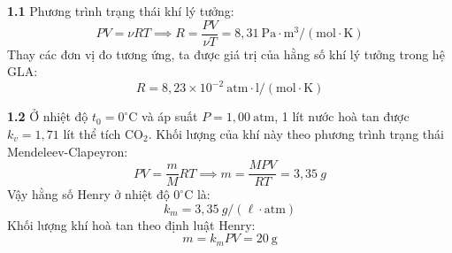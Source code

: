 \noindent\textbf{1.1} Phương trình trạng thái khí lý tưởng:
\begin{equation*}
  PV = \nu RT \implies R = \frac{PV}{\nu T} = 8{,}31~\text{Pa} \cdot \text{m}^3 / (\text{mol} \cdot \text{K})
\end{equation*}
Thay các đơn vị đo tương ứng, ta được giá trị của hằng số khí lý tưởng trong hệ GLA:
\begin{equation*}
  R = 8{,}23 \times 10^{-2}~\text{atm} \cdot \text{l}/(\text{mol} \cdot \text{K})
\end{equation*}

\noindent\textbf{1.2} Ở nhiệt độ $t_0 = 0^\circ$C và áp suất $P = 1{,}00~\text{atm}$, 1 lít nước hoà tan được $k_v = 1{,}71$ lít thể tích $\text{CO}_2$. Khối lượng của khí này theo phương trình trạng thái Mendeleev-Clapeyron:
\begin{equation*}
  PV = \frac{m}{M}RT \implies m = \frac{MPV}{RT} = 3{,}35~g
\end{equation*}
Vậy hằng số Henry ở nhiệt độ $0^\circ$C là:
\begin{equation*}
  k_m = 3{,}35~g / (\ell \cdot \text{atm})
\end{equation*}
Khối lượng khí hoà tan theo định luật Henry:
\begin{equation*}
  m = k_m PV = 20~\text{g}
\end{equation*}

